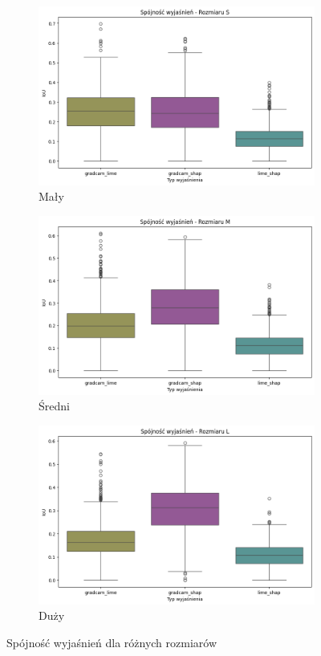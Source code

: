 \begin{figure}
	\centering
	\begin{subfigure}[b]{0.3\textwidth}
		\includegraphics[width=.9\textwidth]{img/base_coherence_size_S}
		\caption{Mały}  \label{}
	\end{subfigure}
	\begin{subfigure}[b]{0.3\textwidth}
		\centering\includegraphics[width=.9\textwidth]{img/base_coherence_size_M}
		\caption{Średni}  \label{}
	\end{subfigure}
	\begin{subfigure}[b]{0.3\textwidth}
		\centering\includegraphics[width=.9\textwidth]{img/base_coherence_size_L}
		\caption{Duży}  \label{}
	\end{subfigure}
	\caption{Spójność wyjaśnień dla różnych rozmiarów}
\end{figure}

